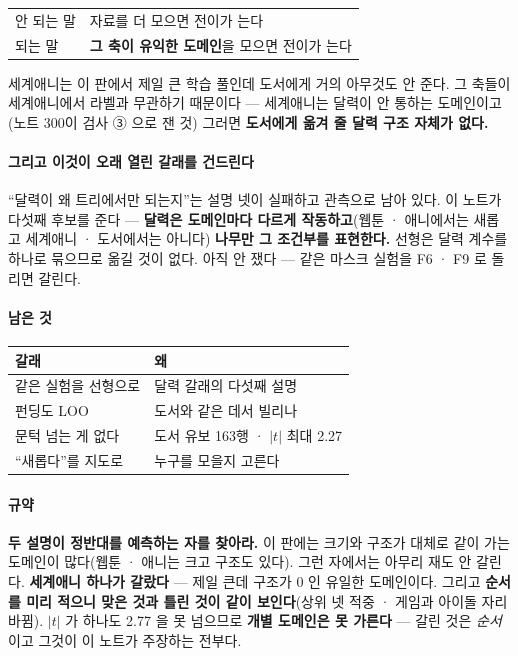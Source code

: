 \documentclass[10pt]{article}
\begin{document}
\begin{center}\footnotesize
\begin{tabular}{ll}
\hline
안 되는 말 & 자료를 더 모으면 전이가 는다 \\
되는 말 & \textbf{그 축이 유익한 도메인}을 모으면 전이가 는다 \\
\hline
\end{tabular}
\end{center}

세계애니는 이 판에서 제일 큰 학습 풀인데 도서에게 거의 아무것도 안 준다.
그 축들이 세계애니에서 라벨과 무관하기 때문이다 --- 세계애니는 달력이
안 통하는 도메인이고(노트 300이 검사 ③ 으로 잰 것) 그러면 \textbf{도서에게
옮겨 줄 달력 구조 자체가 없다.}

\paragraph{그리고 이것이 오래 열린 갈래를 건드린다} ``달력이 왜 트리에서만
되는지''는 설명 넷이 실패하고 관측으로 남아 있다. 이 노트가 다섯째 후보를
준다 --- \textbf{달력은 도메인마다 다르게 작동하고}(웹툰 · 애니에서는
새롭고 세계애니 · 도서에서는 아니다) \textbf{나무만 그 조건부를 표현한다.}
선형은 달력 계수를 하나로 묶으므로 옮길 것이 없다. 아직 안 쟀다 ---
같은 마스크 실험을 F6 · F9 로 돌리면 갈린다.

\paragraph{남은 것}
\begin{center}\small
\begin{tabular}{ll}
\hline
갈래 & 왜 \\
\hline
같은 실험을 선형으로 & 달력 갈래의 다섯째 설명 \\
펀딩도 LOO & 도서와 같은 데서 빌리나 \\
문턱 넘는 게 없다 & 도서 유보 163행 · $|t|$ 최대 2.27 \\
``새롭다''를 지도로 & 누구를 모을지 고른다 \\
\hline
\end{tabular}
\end{center}

\paragraph{규약} \textbf{두 설명이 정반대를 예측하는 자를 찾아라.} 이 판에는
크기와 구조가 대체로 같이 가는 도메인이 많다(웹툰 · 애니는 크고 구조도 있다).
그런 자에서는 아무리 재도 안 갈린다. \textbf{세계애니 하나가 갈랐다} ---
제일 큰데 구조가 0 인 유일한 도메인이다. 그리고 \textbf{순서를 미리 적으니
맞은 것과 틀린 것이 같이 보인다}(상위 넷 적중 · 게임과 아이돌 자리 바뀜).
$|t|$ 가 하나도 2.77 을 못 넘으므로 \textbf{개별 도메인은 못 가른다} ---
갈린 것은 \emph{순서}이고 그것이 이 노트가 주장하는 전부다.
\end{document}
